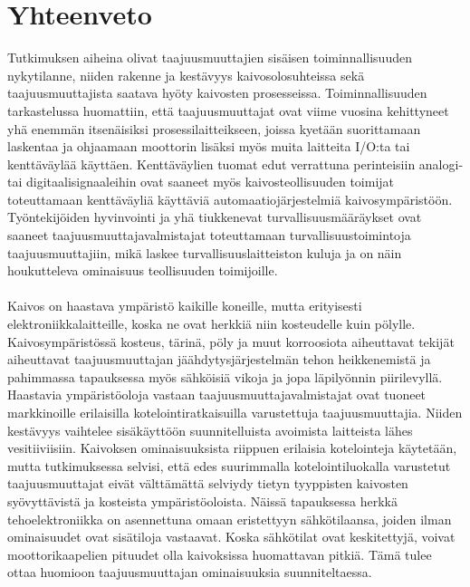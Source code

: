 \documentclass[finnish,12pt,a4paper,pdftex,elec,utf8]{aaltothesis}
\begin{document}
\section{{\large Yhteenveto}}
Tutkimuksen aiheina olivat taajuusmuuttajien sisäisen toiminnallisuuden nykytilanne, niiden rakenne ja kestävyys kaivosolosuhteissa sekä taajuusmuuttajista saatava hyöty kaivosten prosesseissa. Toiminnallisuuden tarkastelussa huomattiin, että taajuusmuuttajat ovat viime vuosina kehittyneet yhä enemmän itsenäisiksi prosessilaitteikseen, joissa kyetään suorittamaan laskentaa ja ohjaamaan moottorin lisäksi myös muita laitteita I/O:ta tai kenttäväylää käyttäen. Kenttäväylien tuomat edut verrattuna perinteisiin analogi- tai digitaalisignaaleihin ovat saaneet myös kaivosteollisuuden toimijat toteuttamaan kenttäväyliä käyttäviä automaatiojärjestelmiä kaivosympäristöön. Työntekijöiden hyvinvointi ja yhä tiukkenevat turvallisuusmääräykset ovat saaneet taajuusmuuttajavalmistajat toteuttamaan turvallisuustoimintoja taajuusmuuttajiin, mikä laskee turvallisuuslaitteiston kuluja ja on näin houkutteleva ominaisuus teollisuuden toimijoille.
\\\\
Kaivos on haastava ympäristö kaikille koneille, mutta erityisesti elektroniikkalaitteille, koska ne ovat herkkiä niin kosteudelle kuin pölylle. Kaivosympäristössä kosteus, tärinä, pöly ja muut korroosiota aiheuttavat tekijät aiheuttavat taajuusmuuttajan jäähdytysjärjestelmän tehon heikkenemistä ja pahimmassa tapauksessa myös sähköisiä vikoja ja jopa läpilyönnin piirilevyllä. Haastavia ympäristöoloja vastaan taajuusmuuttajavalmistajat ovat tuoneet markkinoille erilaisilla kotelointiratkaisuilla varustettuja taajuusmuuttajia. Niiden kestävyys vaihtelee sisäkäyttöön suunnitelluista avoimista laitteista lähes vesitiiviisiin. Kaivoksen ominaisuuksista riippuen erilaisia kotelointeja käytetään, mutta tutkimuksessa selvisi, että edes suurimmalla kotelointiluokalla varustetut taajuusmuuttajat eivät välttämättä selviydy tietyn tyyppisten kaivosten syövyttävistä ja kosteista ympäristöoloista. Näissä tapauksessa herkkä tehoelektroniikka on asennettuna omaan eristettyyn sähkötilaansa, joiden ilman ominaisuudet ovat sisätiloja vastaavat. Koska sähkötilat ovat keskitettyjä, voivat moottorikaapelien pituudet olla kaivoksissa huomattavan pitkiä. Tämä tulee ottaa huomioon taajuusmuuttajan ominaisuuksia suunniteltaessa. 
\\\\
\end{document}
